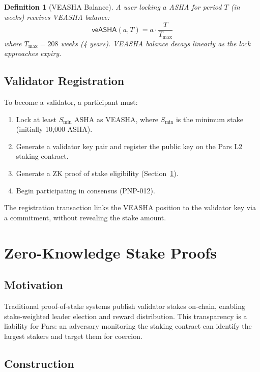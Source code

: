 \documentclass[11pt,a4paper]{article}
\newtheorem{definition}{Definition}[section]
\begin{document}
\begin{definition}[VEASHA Balance]
    A user locking $a$ ASHA for period $T$ (in weeks) receives VEASHA
    balance:
    \[
        \mathsf{veASHA}(a, T) = a \cdot \frac{T}{T_{\max}}
    \]
    where $T_{\max} = 208$ weeks (4 years).  VEASHA balance decays
    linearly as the lock approaches expiry.
\end{definition}

\subsection{Validator Registration}

To become a validator, a participant must:

\begin{enumerate}
    \item Lock at least $S_{\min}$ ASHA as VEASHA, where $S_{\min}$ is
    the minimum stake (initially 10{,}000 ASHA).
    \item Generate a validator key pair and register the public key on
    the Pars L2 staking contract.
    \item Generate a ZK proof of stake eligibility
    (Section~\ref{sec:zkstake}).
    \item Begin participating in consensus (PNP-012).
\end{enumerate}

The registration transaction links the VEASHA position to the validator
key via a commitment, without revealing the stake amount.

\section{Zero-Knowledge Stake Proofs}
\label{sec:zkstake}

\subsection{Motivation}

Traditional proof-of-stake systems publish validator stakes on-chain,
enabling stake-weighted leader election and reward distribution.  This
transparency is a liability for Pars: an adversary monitoring the
staking contract can identify the largest stakers and target them for
coercion.

\subsection{Construction}
\end{document}

